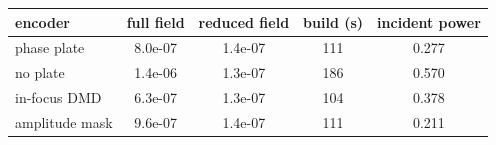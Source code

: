 \begin{tabular}{@{}lcccc@{}}\toprule
encoder & full field & reduced field & build (s) & incident power\\\midrule
phase plate & 8.0e-07 & 1.4e-07 & 111 & 0.277\\
no plate & 1.4e-06 & 1.3e-07 & 186 & 0.570\\
in-focus DMD & 6.3e-07 & 1.3e-07 & 104 & 0.378\\
amplitude mask & 9.6e-07 & 1.4e-07 & 111 & 0.211\\
\bottomrule\end{tabular}
